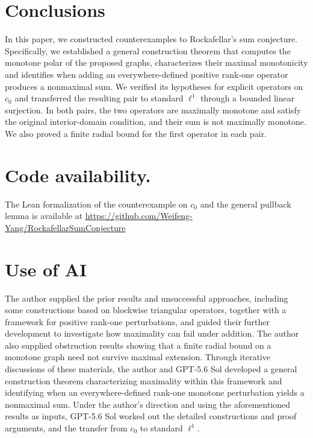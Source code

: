 \documentclass[11pt]{article}
\theoremstyle{definition}
\theoremstyle{remark}
\begin{document}
\section{Conclusions}
\label{sec:conclusion}

In this paper, we constructed counterexamples to Rockafellar's sum conjecture. Specifically, we established a general construction theorem that computes the monotone polar of the proposed graphs, characterizes their maximal monotonicity and identifies when adding an everywhere-defined positive rank-one operator produces a nonmaximal sum. We verified its hypotheses for explicit operators on $c_0$ and transferred the resulting pair to standard $\ell^1$ through a bounded linear surjection. In both pairs, the two operators are maximally monotone and satisfy the original interior-domain condition, and their sum is not maximally monotone. We also proved a finite radial bound for the first operator in each pair.

\section*{Code availability.}
The Lean formalization of the counterexample on $c_0$ and the general pullback lemma is available at \url{https://github.com/Weifeng-Yang/RockafellarSumConjecture}


\section*{Use of AI}
The author supplied the prior results and unsuccessful approaches, including some constructions based on blockwise triangular operators, together with a framework for positive rank-one perturbations, and guided their further development to investigate how maximality can fail under addition. The author also supplied obstruction results showing that a finite radial bound on a monotone graph need not survive maximal extension. Through iterative discussions of these materials, the author and GPT-5.6 Sol developed a general construction theorem characterizing maximality within this framework and identifying when an everywhere-defined rank-one monotone perturbation yields a nonmaximal sum.  Under the author's direction and using the aforementioned results as inputs, GPT-5.6 Sol worked out the detailed constructions and proof arguments, and the transfer from $c_0$ to standard $\ell^1$. 





\begingroup
\raggedright 

\endgroup
\end{document}
